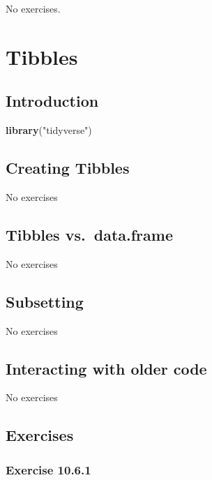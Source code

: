 \documentclass[]{book}
\newenvironment{Shaded}{\begin{snugshade}}{\end{snugshade}}
\newcommand{\KeywordTok}[1]{\textcolor[rgb]{0.13,0.29,0.53}{\textbf{#1}}}
\newcommand{\NormalTok}[1]{#1}
\newcommand{\StringTok}[1]{\textcolor[rgb]{0.31,0.60,0.02}{#1}}
\theoremstyle{plain}
\theoremstyle{remark}
\theoremstyle{definition}
\theoremstyle{definition}
\theoremstyle{definition}
\theoremstyle{remark}
\begin{document}
No exercises.

\hypertarget{tibbles}{%
\chapter{Tibbles}\label{tibbles}}

\hypertarget{introduction-5}{%
\section{Introduction}\label{introduction-5}}

\begin{Shaded}
\begin{Highlighting}[]
\KeywordTok{library}\NormalTok{(}\StringTok{"tidyverse"}\NormalTok{)}
\end{Highlighting}
\end{Shaded}

\hypertarget{creating-tibbles}{%
\section{Creating Tibbles}\label{creating-tibbles}}

No exercises

\hypertarget{tibbles-vs.data.frame}{%
\section{Tibbles vs.~data.frame}\label{tibbles-vs.data.frame}}

No exercises

\hypertarget{subsetting}{%
\section{Subsetting}\label{subsetting}}

No exercises

\hypertarget{interacting-with-older-code}{%
\section{Interacting with older
code}\label{interacting-with-older-code}}

No exercises

\hypertarget{exercises}{%
\section{Exercises}\label{exercises}}

\hypertarget{exercise-10.6.1}{%
\subsection*{\texorpdfstring{Exercise
{10.6.1}}{Exercise 10.6.1}}\label{exercise-10.6.1}}
\end{document}

